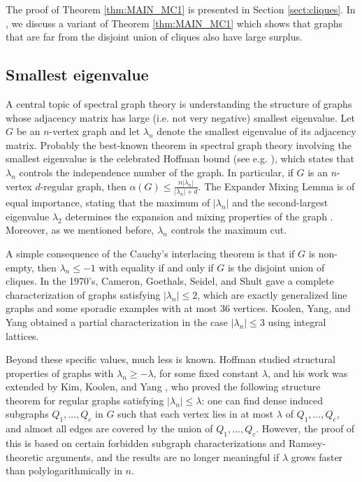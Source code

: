 \documentclass[11pt]{article}
\theoremstyle{plain}
\theoremstyle{definition}
\begin{document}
The proof of Theorem \ref{thm:MAIN_MC1} is presented in Section \ref{sect:cliques}. 
In , we discuss a variant of Theorem \ref{thm:MAIN_MC1} which shows that graphs that are far from the disjoint union of cliques also have large surplus.


\subsection{Smallest eigenvalue}

A central topic of spectral graph theory is understanding the structure of graphs whose adjacency matrix has large (i.e. not very negative) smallest eigenvalue. Let $G$ be an $n$-vertex graph and let $\lambda_n$ denote the smallest eigenvalue of its adjacency matrix. Probably the best-known theorem in spectral graph theory involving the smallest eigenvalue is the celebrated Hoffman bound (see e.g. \cite{H21}), which states that $\lambda_n$ controls the independence number of the graph. In particular, if $G$ is an $n$-vertex $d$-regular graph, then $\alpha(G)\leq \frac{n|\lambda_n|}{|\lambda_n|+d}$. The Expander Mixing Lemma is of equal importance, stating that the maximum of $|\lambda_n|$ and the second-largest eigenvalue $\lambda_2$ determines the expansion and mixing properties of the graph \cite{AC88}. Moreover, as we mentioned before, $\lambda_n$ controls the maximum cut.

 A simple consequence of the Cauchy's interlacing theorem is that if $G$ is non-empty, then $\lambda_n\leq -1$ with equality if and only if $G$ is the disjoint union of cliques. In the 1970's, Cameron, Goethals, Seidel, and Shult \cite{CGSS} gave a complete characterization of graphs satisfying $|\lambda_n|\leq 2$, which are exactly generalized line graphs and some sporadic examples with at most 36 vertices. Koolen, Yang, and Yang \cite{KYY} obtained a partial characterization in the case $|\lambda_n|\leq 3$ using integral lattices. 

Beyond these specific values, much less is known. Hoffman \cite{H73} studied structural properties of graphs with $\lambda_n\geq -\lambda$, for some fixed constant $\lambda$, and his work was extended by Kim, Koolen, and Yang \cite{KKY}, who proved the following structure theorem for regular graphs satisfying $|\lambda_n|\leq \lambda$: one can find dense induced subgraphs $Q_1,\dots,Q_c$ in $G$ such that each vertex lies in at most $\lambda$ of $Q_1,\dots,Q_c$, and almost all edges are covered by the union of $Q_1,\dots,Q_c$. However, the proof of this is based on certain forbidden subgraph characterizations and Ramsey-theoretic arguments, and the results are no longer meaningful if $\lambda$ grows faster than polylogarithmically in $n$. 
\end{document}
